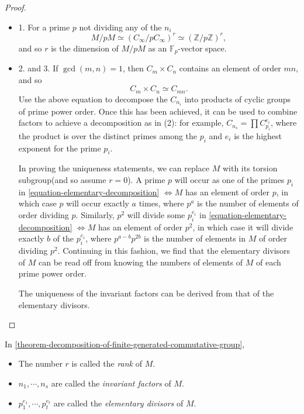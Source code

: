 \begin{proof}
  \begin{itemize}
    \item 1. For a prime \( p \) not dividing any of the \( n_i \)
      \[
        M / p M \simeq (C_\infty / p C_\infty)^r \simeq (\mathbb{Z} / p \mathbb{Z})^r,
      \]
      and so \( r \) is the dimension of \( M / p M \) as an \( \mathbb{F}_p \)-vector space.
    \item 2. and 3.
      If \( \gcd(m, n) = 1 \), then \( C_m \times C_n \) contains an element of order \( mn \), and so
      \[
        C_m \times C_n \simeq C_{mn}.
      \]
      Use the above equation to decompose the \( C_{n_i} \) into products of cyclic groups of prime power order.
      Once this has been achieved, it can be used to combine factors to achieve a decomposition as in (2): for example, \( C_{n_s} = \prod C_{p_i}^{e_i} \), where the product is over the distinct primes among the \( p_i \) and \( e_i \) is the highest exponent for the prime \( p_i \).

      In proving the uniqueness statements, we can replace \( M \) with its torsion subgroup(and so assume \( r = 0 \)).
      A prime \( p \) will occur as one of the primes \( p_i \) in \ref{equation-elementary-decomposition} \( \iff M \) has an element of order \( p \), in which case \( p \) will occur exactly \( a \) times, where \( p^a \) is the number of elements of order dividing \( p \).
      Similarly, \( p^2 \) will divide some \( p^{e_i}_i \) in \ref{equation-elementary-decomposition} \( \iff M  \) has an element of order \( p^2 \), in which case it will divide exactly \( b \) of the \( p^{e_i}_i \), where \( p^{a - b}p^{2b} \) is the number of elements in \( M \) of order dividing \( p^2 \).
      Continuing in this fashion, we find that the elementary divisors of \( M \) can be read off from knowing the numbers of elements of \( M \) of each prime power order.

      The uniqueness of the invariant factors can be derived from that of the elementary divisors.
  \end{itemize}
\end{proof}

\begin{definition}
  \label{definition-rank}
  \label{definition-invariant-factor}
  \label{definition-elementary-divisors}
  In \ref{theorem-decomposition-of-finite-generated-commutative-group},
  \begin{itemize}
    \item The number \( r \) is called the \emph{rank} of \( M \).
    \item \( n_1, \cdots, n_s \) are called the \emph{invariant factors} of \( M \).
    \item \( p^{e_1}_{1}, \cdots, p^{e_t}_t \) are called the \emph{elementary divisors} of \( M \).
  \end{itemize}
\end{definition}

